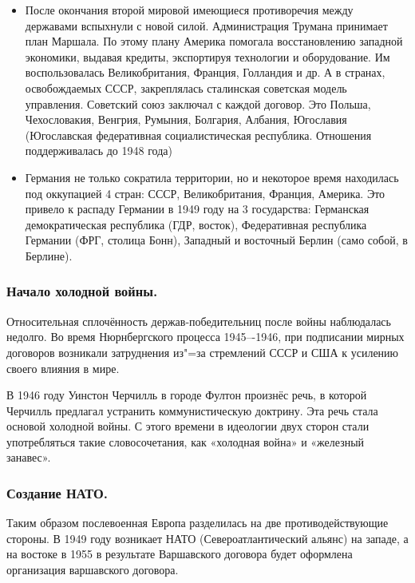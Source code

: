 \begin{itemize}
    \item После окончания второй мировой имеющиеся противоречия между державами вспыхнули с новой силой. Администрация Трумана принимает план Маршала. По этому плану Америка помогала восстановлению западной экономики, выдавая кредиты, экспортируя технологии и оборудование. Им воспользовалась Великобритания, Франция, Голландия и др. А в странах, освобождаемых СССР, закреплялась сталинская советская модель управления. Советский союз заключал с каждой договор. Это Польша, Чехословакия, Венгрия, Румыния, Болгария, Албания, Югославия (Югославская федеративная социалистическая республика. Отношения поддерживалась до 1948 года)
    \item Германия не только сократила территории, но и некоторое время находилась под оккупацией 4 стран: СССР, Великобритания, Франция, Америка. Это привело к распаду Германии в 1949 году на 3 государства: Германская демократическая республика (ГДР, восток), Федеративная республика Германии (ФРГ, столица Бонн), Западный и восточный Берлин (само собой, в Берлине).
\end{itemize}

\subsubsection{\textbf{Начало холодной войны.}}

Относительная сплочённость держав-победительниц после войны наблюдалась недолго. Во время Нюрнбергского процесса 1945–-1946, при подписании мирных договоров возникали затруднения из"=за стремлений СССР и США к усилению своего влияния в мире.

В 1946 году Уинстон Черчилль в городе Фултон произнёс речь, в которой Черчилль предлагал устранить коммунистическую доктрину. Эта речь стала основой холодной войны. С этого времени в идеологии двух сторон стали употребляться такие словосочетания, как «холодная война» и «железный занавес». 

\subsubsection{\textbf{Создание НАТО.}}

Таким образом послевоенная Европа разделилась на две противодействующие стороны. В 1949 году возникает НАТО (Североатлантический альянс) на западе, а на востоке в 1955 в результате Варшавского договора будет оформлена организация варшавского договора. 

